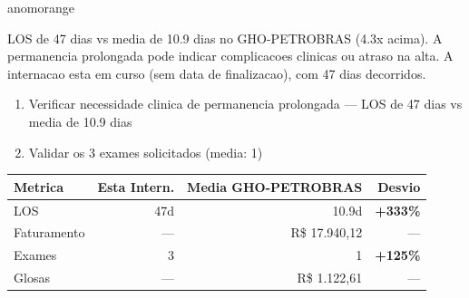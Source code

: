 \documentclass[a4paper,10pt]{article}
\begin{document}
\begin{anomalycard}[Internacao 164488 | GHO-PETROBRAS | ALTO (z=3.91)]{anomorange}
\vspace{2pt}\begin{tcolorbox}[colback=severityred!20,colframe=anomorange,title={\textbf{Interpretacao de Negocio}},fonttitle=\bfseries\small,left=4pt,right=4pt,top=3pt,bottom=3pt]
{\small LOS de 47 dias vs media de 10.9 dias no GHO-PETROBRAS (4.3x acima). A permanencia prolongada pode indicar complicacoes clinicas ou atraso na alta. A internacao esta em curso (sem data de finalizacao), com 47 dias decorridos.}
\end{tcolorbox}
\begin{tcolorbox}[colback=severityyellow!30,colframe=anomorange,title={\textbf{Recomendacoes Especificas}},fonttitle=\bfseries\small,left=4pt,right=4pt,top=3pt,bottom=3pt]
\begin{enumerate}[nosep,leftmargin=16pt]
\item {\small Verificar necessidade clinica de permanencia prolongada --- LOS de 47 dias vs media de 10.9 dias}
\item {\small Validar os 3 exames solicitados (media: 1)}
\end{enumerate}
\end{tcolorbox}
\begin{center}\begin{tabular}{l r r r}\toprule\textbf{Metrica} & \textbf{Esta Intern.} & \textbf{Media GHO-PETROBRAS} & \textbf{Desvio} \\\midrule
LOS & 47d & 10.9d & \textcolor{anomred}{\textbf{+333\%}} \\
Faturamento & --- & R\$ 17.940,12 & --- \\
Exames & 3 & 1 & \textcolor{anomred}{\textbf{+125\%}} \\
Glosas & --- & R\$ 1.122,61 & --- \\
\bottomrule\end{tabular}\end{center}


\end{anomalycard}
\end{document}

